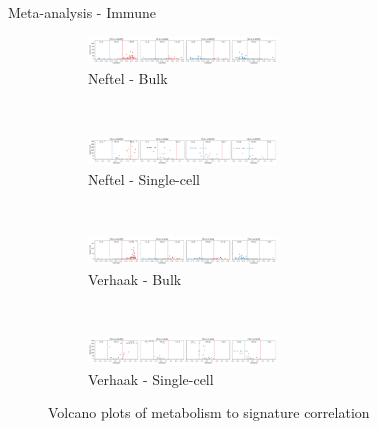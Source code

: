 \documentclass[aspectratio=169,9pt]{beamer}
\begin{document}
    \begin{frame}{Meta-analysis - Immune}
        \begin{adjustwidth}{-5cm}{-5cm}
            \centering
            \begin{figure}
                \centering
                \begin{subfigure}[c]{\textwidth}
                    \centering
                    \includegraphics[width=0.55\textwidth]{volcano_Bulk_Nef_Imm}
                    \caption{Neftel - Bulk}
                \end{subfigure}
                \\
                \begin{subfigure}[c]{\textwidth}
                    \centering
                    \includegraphics[width=0.55\textwidth]{volcano_SC_Nef_Imm}
                    \caption{Neftel - Single-cell}
                \end{subfigure}
                \\
                \begin{subfigure}[c]{\textwidth}
                    \centering
                    \includegraphics[width=0.55\textwidth]{volcano_Bulk_Ver_Imm}
                    \caption{Verhaak - Bulk}
                \end{subfigure}
                \\
                \begin{subfigure}[c]{\textwidth}
                    \centering
                    \includegraphics[width=0.55\textwidth]{volcano_SC_Ver_Imm}
                    \caption{Verhaak - Single-cell}
                \end{subfigure}
                \caption{Volcano plots of metabolism to signature correlation}
            \end{figure}
        \end{adjustwidth}
    \end{frame}
\end{document}
